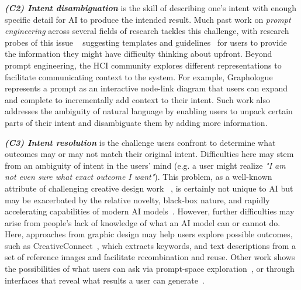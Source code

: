 \vspace{5pt}\textit{\textbf{(C2) Intent disambiguation}} is the skill of describing one's intent with enough specific detail for AI to produce the intended result. Much past work on \textit{prompt engineering} across several fields of research tackles this challenge, with research probes of this issue ~\cite{zamfirescu-pereira_why_2023} suggesting templates and guidelines~\cite{bozkurt_tell_2024} for users to provide the information they might have difficulty thinking about upfront. Beyond prompt engineering, the HCI community explores different representations to facilitate communicating context to the system. For example, Graphologue~\cite{jiang_graphologue_2023} represents a prompt as an interactive node-link diagram that users can expand and complete to incrementally add context to their intent. Such work also addresses the ambiguity of natural language by enabling users to unpack certain parts of their intent and disambiguate them by adding more information. 

\vspace{5pt}\textit{\textbf{(C3) Intent resolution}} is the challenge users confront to determine what outcomes may or may not match their original intent. Difficulties here may stem from an ambiguity of intent in the users' mind (e.g. a user might realize \textit{"I am not even sure what exact outcome I want"}). This problem, as a well-known attribute of challenging creative design work ~\cite{DesignReflectiveConversation1992, ReflectivePhysicalPrototyping2006, BuxtonSketchingUserExperiences2007}, is certainly not unique to AI but may be exacerbated by the relative novelty, black-box nature, and rapidly accelerating capabilities of modern AI models~\cite{bubeck2023sparks}. 
However, further difficulties may arise from people's lack of knowledge of what an AI model can or cannot do. 
Here, approaches from graphic design may help users explore possible outcomes, such as CreativeConnect~\cite{choi_creativeconnect_2024}, which extracts keywords, and text descriptions from a set of reference images and facilitate recombination and reuse. Other work shows the possibilities of what users can ask via prompt-space exploration~\cite{almeda_prompting_2024}, or through interfaces that reveal what results a user can generate~\cite{suh_luminate_2024}.

